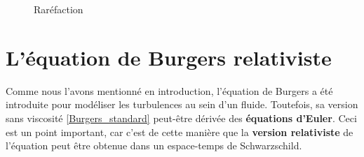 \documentclass[11pt,a4paper]{article}
\begin{document}
\begin{figure}[htb]\centering
{}
\hspace*{1cm}
\caption{Raréfaction}\label{figure_rarefaction}
\end{figure}

\section{L'équation de Burgers relativiste}

Comme nous l'avons mentionné en introduction, l'équation de Burgers a été introduite pour modéliser les turbulences au sein d'un fluide. Toutefois, sa version sans viscosité \eqref{Burgers_standard} peut-être dérivée des \textbf{équations d'Euler}. Ceci est un point important, car c'est de cette manière que la \textbf{version relativiste} de l'équation peut être obtenue dans un espace-temps de Schwarzschild.
\end{document}
